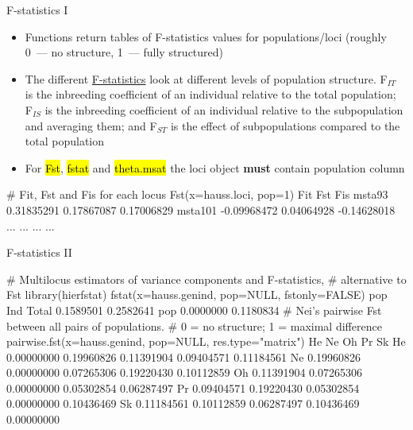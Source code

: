 \documentclass[compress, ucs, xelatex, 11pt, xcolor=svgnames,
  hyperref={
    bookmarks=true,
    unicode=true,
    colorlinks=true,
    pdftitle={Molecular data in R},
    plainpages=false,
    pdfauthor={Vojtech Zeisek},
    pdfsubject={Course about phylogeny and evolution in R},
    pdfcreator={XeLaTeX},
    pdfkeywords={R, evolution, phylogeny, molecular data},
    linkcolor=Tomato,
    anchorcolor=SaddleBrown,
    citecolor=Goldenrod,
    filecolor=DarkMagenta,
    menucolor=Sienna,
    urlcolor=DarkTurquoise,
    pdftex},
  url={hyphens, lowtilde} %
  ]{beamer}
\renewcommand{\texttt}[1]{\hl{\ttfamily #1}}
\begin{document}
\begin{frame}[fragile]{F-statistics I}
  \begin{itemize}
    \item Functions return tables of F-statistics values for populations/loci (roughly 0~--- no structure, 1~--- fully structured)
    \item The different \href{https://en.wikipedia.org/wiki/F-statistics}{F-statistics} look at different levels of population structure. F$_{IT}$ is the inbreeding coefficient of an individual relative to the total population; F$_{IS}$ is the inbreeding coefficient of an individual relative to the subpopulation and averaging them; and F$_{ST}$ is the effect of subpopulations compared to the total population
    \item For \texttt{Fst}, \texttt{fstat} and \texttt{theta.msat} the loci object \textbf{must} contain population column
  \end{itemize}
  \begin{spluscode}
    # Fit, Fst and Fis for each locus
    Fst(x=hauss.loci, pop=1)
                    Fit        Fst         Fis
    msta93   0.31835291 0.17867087  0.17006829
    msta101 -0.09968472 0.04064928 -0.14628018
        ...         ...        ...         ...
  \end{spluscode}
\end{frame}

\begin{frame}[fragile]{F-statistics II}
  \begin{spluscode}
    # Multilocus estimators of variance components and F-statistics,
    # alternative to Fst
    library(hierfstat)
    fstat(x=hauss.genind, pop=NULL, fstonly=FALSE)
                pop       Ind
    Total 0.1589501 0.2582641
    pop   0.0000000 0.1180834
    # Nei's pairwise Fst between all pairs of populations.
    # 0 = no structure; 1 = maximal difference
    pairwise.fst(x=hauss.genind, pop=NULL, res.type="matrix")
               He         Ne         Oh         Pr         Sk
    He 0.00000000 0.19960826 0.11391904 0.09404571 0.11184561
    Ne 0.19960826 0.00000000 0.07265306 0.19220430 0.10112859
    Oh 0.11391904 0.07265306 0.00000000 0.05302854 0.06287497
    Pr 0.09404571 0.19220430 0.05302854 0.00000000 0.10436469
    Sk 0.11184561 0.10112859 0.06287497 0.10436469 0.00000000
  \end{spluscode}
\end{frame}
\end{document}
